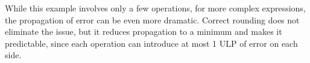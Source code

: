 While this example involves only a few operations, for more complex expressions, the propagation of error can be even more dramatic. 
Correct rounding does not eliminate the issue, but it reduces propagation to a minimum and makes it predictable, since each operation can introduce at most 1 ULP of error on each side.

%
